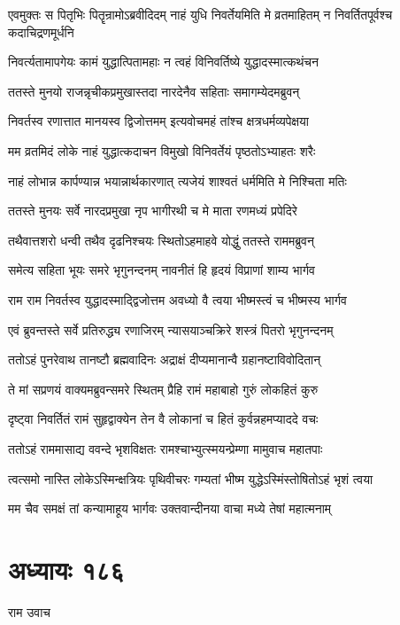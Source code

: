 \threelineshloka
{एवमुक्तः स पितृभिः पितॄन्रामोऽब्रवीदिदम्}
{नाहं युधि निवर्तेयमिति मे व्रतमाहितम्}
{न निवर्तितपूर्वश्च कदाचिद्रणमूर्धनि}


\twolineshloka
{निवर्त्यतामापगेयः कामं युद्धात्पितामहाः}
{न त्वहं विनिवर्तिष्ये युद्धादस्मात्कथंचन}


\twolineshloka
{ततस्ते मुनयो राजन्नृचीकप्रमुखास्तदा}
{नारदेनैव सहिताः समागम्येदमब्रुवन्}


\twolineshloka
{निवर्तस्व रणात्तात मानयस्व द्विजोत्तमम्}
{इत्यवोचमहं तांश्च क्षत्रधर्मव्यपेक्षया}


\twolineshloka
{मम व्रतमिदं लोके नाहं युद्धात्कदाचन}
{विमुखो विनिवर्तेयं पृष्ठतोऽभ्याहतः शरैः}


\twolineshloka
{नाहं लोभान्न कार्पण्यान्न भयान्नार्थकारणात्}
{त्यजेयं शाश्वतं धर्ममिति मे निश्चिता मतिः}


\twolineshloka
{ततस्ते मुनयः सर्वे नारदप्रमुखा नृप}
{भागीरथी च मे माता रणमध्यं प्रपेदिरे}


\twolineshloka
{तथैवात्तशरो धन्वी तथैव दृढनिश्चयः}
{स्थितोऽहमाहवे योद्धुं ततस्ते राममब्रुवन्}


\twolineshloka
{समेत्य सहिता भूयः समरे भृगुनन्दनम्}
{नावनीतं हि हृदयं विप्राणां शाम्य भार्गव}


\twolineshloka
{राम राम निवर्तस्व युद्धादस्माद्द्विजोत्तम}
{अवध्यो वै त्वया भीष्मस्त्वं च भीष्मस्य भार्गव}


\twolineshloka
{एवं ब्रुवन्तस्ते सर्वे प्रतिरुद्ध्य रणाजिरम्}
{न्यासयाञ्चक्रिरे शस्त्रं पितरो भृगुनन्दनम्}


\twolineshloka
{ततोऽहं पुनरेवाथ तानष्टौ ब्रह्मवादिनः}
{अद्राक्षं दीप्यमानान्वै ग्रहानष्टाविवोदितान्}


\twolineshloka
{ते मां सप्रणयं वाक्यमब्रुवन्समरे स्थितम्}
{प्रैहि रामं महाबाहो गुरुं लोकहितं कुरु}


\twolineshloka
{दृष्ट्वा निवर्तितं रामं सुहृद्वाक्येन तेन वै}
{लोकानां च हितं कुर्वन्नहमप्याददे वचः}


\twolineshloka
{ततोऽहं राममासाद्य ववन्दे भृशविक्षतः}
{रामश्चाभ्युत्स्मयन्प्रेम्णा मामुवाच महातपाः}


\twolineshloka
{त्वत्समो नास्ति लोकेऽस्मिन्क्षत्रियः पृथिवीचरः}
{गम्यतां भीष्म युद्धेऽस्मिंस्तोषितोऽहं भृशं त्वया}


\twolineshloka
{मम चैव समक्षं तां कन्यामाहूय भार्गवः}
{उक्तवान्दीनया वाचा मध्ये तेषां महात्मनाम्}


\chapter{अध्यायः १८६}
\twolineshloka
{राम उवाच}
{}


